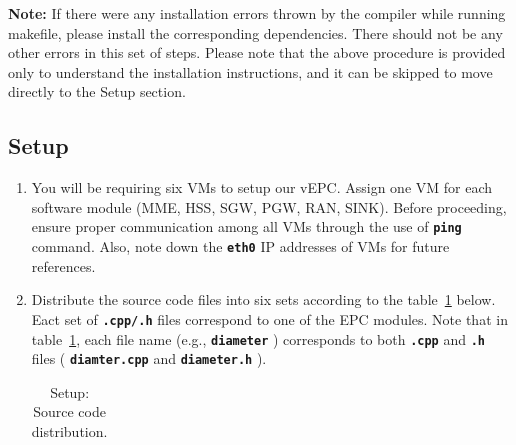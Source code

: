 \pdfminorversion=4\documentclass[hidelinks]{report}
\newcommand{\cf}[1] {
	\textbf{\texttt{#1}}
}
\begin{document}
\textbf{Note:} If there were any installation errors thrown by the compiler while running makefile, please install the corresponding dependencies. There should not be any other errors in this set of steps. Please note that the above procedure is provided only to understand the installation instructions, and it can be skipped to move directly to the Setup section.

\subsection*{Setup}

\begin{enumerate}

\item You will be requiring six VMs to setup our vEPC. Assign one VM for each software module (MME, HSS, SGW, PGW, RAN, SINK). Before proceeding, ensure proper communication among all VMs through the use of \cf{ping} command. Also, note down the \cf{eth0} IP addresses of VMs for future references.

\item Distribute the source code files into six sets according to the table~\ref{distribution} below. Eact set of \cf{.cpp/.h} files correspond to one of the EPC modules. Note that in table~\ref{distribution}, each file name (e.g., \cf{diameter}) corresponds to both \cf{.cpp} and \cf{.h} files (\cf{diamter.cpp} and \cf{diameter.h}).

\begin{table}[H]

\caption{Setup: Source code distribution.}
\centering
\label{distribution}
\def\arraystretch{1.5}

\begin{tabular}{|c|c|c|c|c|c|c|}


\end{tabular}
\end{table}
\end{enumerate}
\end{document}
